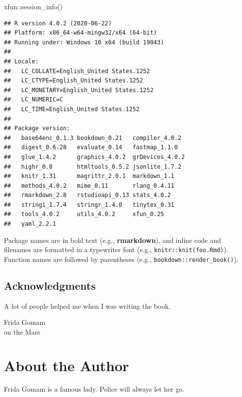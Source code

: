 \documentclass[
]{krantz}
\makeatletter
\newenvironment{Shaded}{\begin{snugshade}}{\end{snugshade}}
\newcommand{\FunctionTok}[1]{\textcolor[rgb]{0,0,0}{#1}}
\newcommand{\NormalTok}[1]{#1}
\newcommand{\SpecialCharTok}[1]{\textcolor[rgb]{0,0,0}{#1}}
\newenvironment{kframe}{%
\medskip{}
\setlength{\fboxsep}{.8em}
 \def\at@end@of@kframe{}%
 \ifinner\ifhmode%
  \def\at@end@of@kframe{\end{minipage}}%
  \begin{minipage}{\columnwidth}%
 \fi\fi%
 \def\FrameCommand##1{\hskip\@totalleftmargin \hskip-\fboxsep
 \colorbox{shadecolor}{##1}\hskip-\fboxsep
     \hskip-\linewidth \hskip-\@totalleftmargin \hskip\columnwidth}%
 \MakeFramed {\advance\hsize-\width
   \@totalleftmargin\z@ \linewidth\hsize
   \@setminipage}}%
 {\par\unskip\endMakeFramed%
 \at@end@of@kframe}
\renewenvironment{Shaded}{\begin{kframe}}{\end{kframe}}
\makeatother
\begin{document}
\begin{Shaded}
\begin{Highlighting}[]
\NormalTok{xfun}\SpecialCharTok{::}\FunctionTok{session\_info}\NormalTok{()}
\end{Highlighting}
\end{Shaded}

\begin{verbatim}
## R version 4.0.2 (2020-06-22)
## Platform: x86_64-w64-mingw32/x64 (64-bit)
## Running under: Windows 10 x64 (build 19043)
## 
## Locale:
##   LC_COLLATE=English_United States.1252 
##   LC_CTYPE=English_United States.1252   
##   LC_MONETARY=English_United States.1252
##   LC_NUMERIC=C                          
##   LC_TIME=English_United States.1252    
## 
## Package version:
##   base64enc_0.1.3 bookdown_0.21   compiler_4.0.2 
##   digest_0.6.28   evaluate_0.14   fastmap_1.1.0  
##   glue_1.4.2      graphics_4.0.2  grDevices_4.0.2
##   highr_0.8       htmltools_0.5.2 jsonlite_1.7.2 
##   knitr_1.31      magrittr_2.0.1  markdown_1.1   
##   methods_4.0.2   mime_0.11       rlang_0.4.11   
##   rmarkdown_2.8   rstudioapi_0.13 stats_4.0.2    
##   stringi_1.7.4   stringr_1.4.0   tinytex_0.31   
##   tools_4.0.2     utils_4.0.2     xfun_0.25      
##   yaml_2.2.1
\end{verbatim}

Package names are in bold text (e.g., \textbf{rmarkdown}), and inline code and filenames are formatted in a typewriter font (e.g., \texttt{knitr::knit(\textquotesingle{}foo.Rmd\textquotesingle{})}). Function names are followed by parentheses (e.g., \texttt{bookdown::render\_book()}).

\hypertarget{acknowledgments}{%
\section*{Acknowledgments}\label{acknowledgments}}


A lot of people helped me when I was writing the book.

\begin{flushright}
Frida Gomam\\
on the Mars
\end{flushright}

\hypertarget{about-the-author}{%
\chapter*{About the Author}\label{about-the-author}}


Frida Gomam is a famous lady. Police will always let her go.
\end{document}
